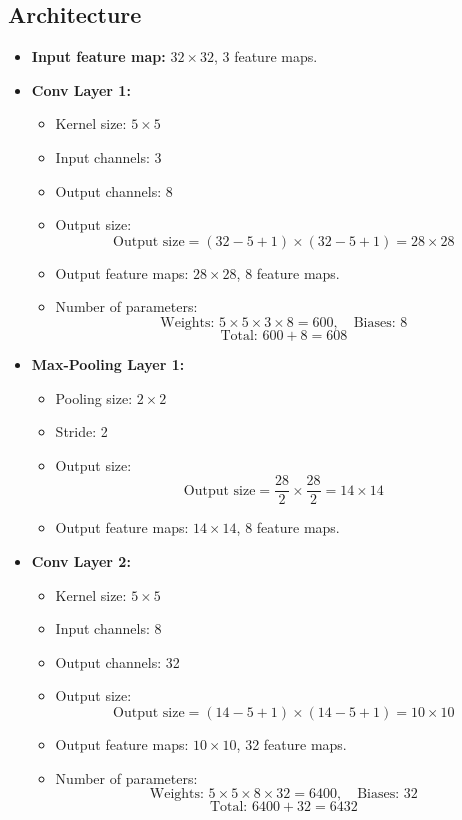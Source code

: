 \documentclass[a4paper,12pt]{article}
\begin{document}
\subsection*{Architecture}
\begin{itemize}
    \item \textbf{Input feature map:} \( 32 \times 32 \), 3 feature maps.

    \item \textbf{Conv Layer 1:}
    \begin{itemize}
        \item Kernel size: \( 5 \times 5 \)
        \item Input channels: 3
        \item Output channels: 8
        \item Output size:
        \[
        \text{Output size} = (32 - 5 + 1) \times (32 - 5 + 1) = 28 \times 28
        \]
        \item Output feature maps: \( 28 \times 28 \), 8 feature maps.
        \item Number of parameters:
        \[
        \text{Weights: } 5 \times 5 \times 3 \times 8 = 600, \quad \text{Biases: } 8
        \]
        \[
        \text{Total: } 600 + 8 = 608
        \]
    \end{itemize}

    \item \textbf{Max-Pooling Layer 1:}
    \begin{itemize}
        \item Pooling size: \( 2 \times 2 \)
        \item Stride: 2
        \item Output size:
        \[
        \text{Output size} = \frac{28}{2} \times \frac{28}{2} = 14 \times 14
        \]
        \item Output feature maps: \( 14 \times 14 \), 8 feature maps.
    \end{itemize}

    \item \textbf{Conv Layer 2:}
    \begin{itemize}
        \item Kernel size: \( 5 \times 5 \)
        \item Input channels: 8
        \item Output channels: 32
        \item Output size:
        \[
        \text{Output size} = (14 - 5 + 1) \times (14 - 5 + 1) = 10 \times 10
        \]
        \item Output feature maps: \( 10 \times 10 \), 32 feature maps.
        \item Number of parameters:
        \[
        \text{Weights: } 5 \times 5 \times 8 \times 32 = 6400, \quad \text{Biases: } 32
        \]
        \[
        \text{Total: } 6400 + 32 = 6432
        \]
    \end{itemize}


\end{itemize}
\end{document}

